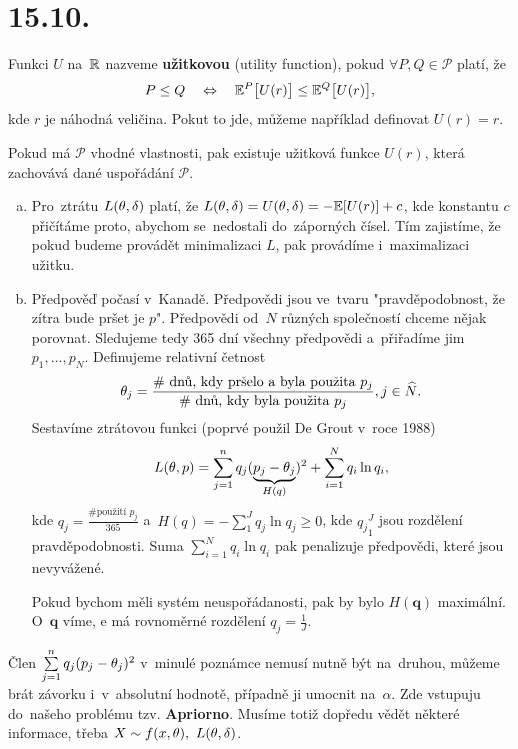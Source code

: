 \section{15.10.}
\begin{define}
	Funkci $U$ na~$\mathbb{R}$ nazveme \textbf{užitkovou} (utility function), pokud $\forall P,Q\in\mathcal{P}$ platí, že 
	$$ P\leq Q\quad\Leftrightarrow\quad\mathbb{E}^P\big[U(r)\big]\leq\mathbb{E}^Q\big[U(r)\big],$$ kde $r$ je náhodná veličina. Pokut to jde, můžeme například definovat $U(r)=r$.
\end{define}
\begin{remark}
	Pokud má $\mathcal{P}$ vhodné vlastnosti, pak existuje užitková funkce $U(r)$, která zachovává dané uspořádání $\mathcal{P}$. 
\end{remark}
\begin{remark}
	\begin{enumerate}[a)]
		\item Pro~ztrátu $L(\theta,\delta)$ platí, že $L(\theta,\delta)=U(\theta,\delta)=-\mathbb{E}[U(r)]+c$, kde konstantu $c$ přičítáme proto, abychom se~nedostali do~záporných čísel. Tím zajistíme, že pokud budeme provádět minimalizaci $L$, pak provádíme i~maximalizaci užitku.
		\item Předpověď počasí v~Kanadě. Předpovědi jsou ve~tvaru "pravděpodobnost, že zítra bude pršet je $p$". Předpovědi od~$N$ různých společností chceme nějak porovnat. Sledujeme tedy 365 dní všechny předpovědi a~přiřadíme jim $p_1,...,p_N$. Definujeme relativní četnost $$\theta_j=\frac{\text{\# dnů, kdy pršelo a~byla použita }p_j}{\text{\# dnů, kdy byla použita }p_j},j\in\widehat{N}.$$ Sestavíme ztrátovou funkci (poprvé použil De Grout v~roce 1988) $$L(\theta,p)=\sum\limits_{j=1}^{n} q_j(\underbrace{p_j-\theta_j}_{H(q)})^2+\sum_{i=1}^N q_i\ln q_i,$$ kde $q_j=\frac{\text{\# použití }p_j}{365}$ a~$H(q)=-\sum_1^J q_j\ln q_j\geq 0$, kde ${q_j}_1^J$ jsou rozdělení pravděpodobnosti. Suma $\sum_{i=1}^N q_i\ln q_i$ pak penalizuje předpovědi, které jsou nevyvážené.
		
		Pokud bychom měli systém neuspořádanosti, pak by bylo $H(\textbf{q})$ maximální. O~$\textbf{q}$ víme, e má rovnoměrné rozdělení $q_j=\frac{1}{J}$.
	\end{enumerate}
\end{remark}
\begin{remark}
	Člen $\sum\limits_{j=1}^{n} q_j(p_j-\theta_j)^2$ v~minulé poznámce nemusí nutně být na~druhou, můžeme brát závorku i~v~absolutní hodnotě, případně ji umocnit na~$\alpha$. Zde vstupuju do~našeho problému tzv. \textbf{Apriorno}. Musíme totiž dopředu vědět některé informace, třeba $X\sim f(x,\theta),~L(\theta,\delta)$.
\end{remark}
